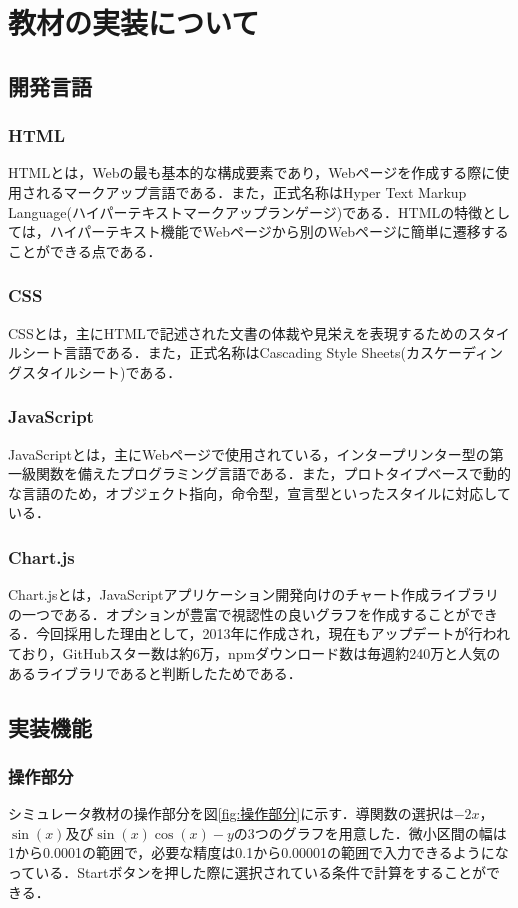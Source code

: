 \documentclass[a4paper, 12pt]{ltjsarticle}
\begin{document}
\section{教材の実装について}
\subsection{開発言語}
\subsubsection{HTML}
HTMLとは，Webの最も基本的な構成要素であり，Webページを作成する際に使用されるマークアップ言語である．また，正式名称はHyper Text Markup Language(ハイパーテキストマークアップランゲージ)である．HTMLの特徴としては，ハイパーテキスト機能でWebページから別のWebページに簡単に遷移することができる点である．
\subsubsection{CSS}
CSSとは，主にHTMLで記述された文書の体裁や見栄えを表現するためのスタイルシート言語である．また，正式名称はCascading Style Sheets(カスケーディングスタイルシート)である．
\subsubsection{JavaScript}
JavaScriptとは，主にWebページで使用されている，インタープリンター型の第一級関数を備えたプログラミング言語である．また，プロトタイプベースで動的な言語のため，オブジェクト指向，命令型，宣言型といったスタイルに対応している．
\subsubsection{Chart.js}
Chart.jsとは，JavaScriptアプリケーション開発向けのチャート作成ライブラリの一つである．オプションが豊富で視認性の良いグラフを作成することができる．今回採用した理由として，2013年に作成され，現在もアップデートが行われており，GitHubスター数は約6万，npmダウンロード数は毎週約240万と人気のあるライブラリであると判断したためである．
\clearpage
\subsection{実装機能}
\subsubsection{操作部分}
シミュレータ教材の操作部分を図\ref{fig:操作部分}に示す．導関数の選択は$-2x$，$\sin(x)$及び$\sin(x)\cos(x)-y$の3つのグラフを用意した．微小区間の幅は1から0.0001の範囲で，必要な精度は0.1から0.00001の範囲で入力できるようになっている．Startボタンを押した際に選択されている条件で計算をすることができる．
\end{document}
